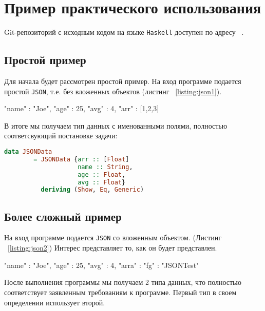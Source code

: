 \chapter{Пример практического использования}

Git-репозиторий с исходным кодом на языке \lstinline{Haskell} доступен по адресу ~\cite{diploma}. 

\section{Простой пример}
Для начала будет рассмотрен простой пример. На вход программе подается простой \lstinline{JSON}, т.е. без вложенных объектов (листинг ~\ref{listing:json1}).

\begin{ListingEnv}[H]
\begin{Verb}
{
    "name" : "Joe",
    "age" : 25,
    "avg" : 4,
    "arr" : [1,2,3]
}
\end{Verb}
\label{listing:json1}
\end{ListingEnv}

В итоге мы получаем тип данных с именованными полями, полностью соответсвующий постановке задачи:

\begin{lstlisting}[language=Haskell]
data JSONData 
        = JSONData {arr :: [Float]
                    name :: String,
                    age :: Float,
                    avg :: Float}
          deriving (Show, Eq, Generic)
\end{lstlisting}

\section{Более сложный пример}

На вход программе подается \lstinline{JSON} со вложенным объектом. (Листинг ~\ref{listing:json2})  Интерес представляет то, как он будет представлен. 

\begin{ListingEnv}[H]
\begin{Verb}
{
    "name" : "Joe",
    "age" : 25,
    "avg" : 4,
    "arra" : 
             {
                 "fg" : "JSONTest"  
             }
}
\end{Verb}
\label{listing:json2}
\end{ListingEnv}

После выполнения программы мы получаем 2 типа данных, что полностью соответствует заявленным требованиям к программе. Первый тип в своем определении использует второй. 

